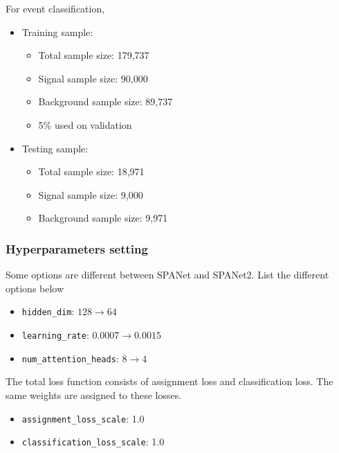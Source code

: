 \documentclass[12pt]{article}
\begin{document}
			For event classification,
			\begin{itemize}
				\item Training sample:
				\begin{itemize}
					\item Total sample size: 179,737
					\item Signal sample size: 90,000
					\item Background sample size: 89,737
					\item 5\% used on validation
				\end{itemize}
				\item Testing sample:
				\begin{itemize}
					\item Total sample size: 18,971
					\item Signal sample size: 9,000
					\item Background sample size: 9,971
				\end{itemize}
			\end{itemize}
		\subsubsection{Hyperparameters setting}%
		\label{subs:hyperparameters_setting}
			Some options are different between SPANet and SPANet2. List the different options below
			\begin{itemize}
				\item \verb+hidden_dim+: $128 \to 64$ 
				\item \verb+learning_rate+: $0.0007 \to 0.0015$ 
				\item \verb+num_attention_heads+: $8 \to 4$ 
			\end{itemize}

			The total loss function consists of assignment loss and classification loss. The same weights are assigned to these losses.
			\begin{itemize}
				\item \verb+assignment_loss_scale+: 1.0
				\item \verb+classification_loss_scale+: 1.0
			\end{itemize}
\end{document}
